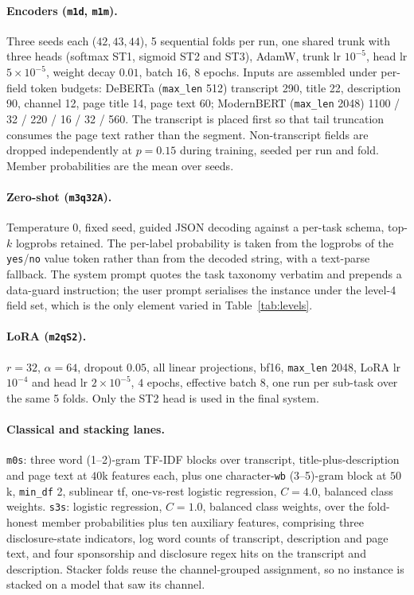 \documentclass[11pt]{article}
\newcommand{\lab}[1]{\texttt{\small #1}}
\begin{document}
\paragraph{Encoders (\lab{m1d}, \lab{m1m}).}
Three seeds each ($42,43,44$), 5 sequential folds per run, one shared trunk with three heads
(softmax ST1, sigmoid ST2 and ST3), AdamW, trunk lr $10^{-5}$, head lr $5\!\times\!10^{-5}$,
weight decay $0.01$, batch $16$, $8$ epochs. Inputs are assembled under per-field token budgets:
DeBERTa (\lab{max\_len} 512) transcript 290, title 22, description 90, channel 12, page title 14,
page text 60; ModernBERT (\lab{max\_len} 2048) 1100 / 32 / 220 / 16 / 32 / 560. The transcript is
placed first so that tail truncation consumes the page text rather than the segment.
Non-transcript fields are dropped independently at $p=0.15$ during training, seeded per run and
fold. Member probabilities are the mean over seeds.

\paragraph{Zero-shot (\lab{m3q32A}).}
Temperature $0$, fixed seed, guided JSON decoding against a per-task schema, top-$k$ logprobs
retained. The per-label probability is taken from the logprobs of the \lab{yes}/\lab{no} value
token rather than from the decoded string, with a text-parse fallback. The system prompt quotes
the task taxonomy verbatim and prepends a data-guard instruction; the user prompt serialises the
instance under the level-4 field set, which is the only element varied in
Table~\ref{tab:levels}.

\paragraph{LoRA (\lab{m2qS2}).}
$r=32$, $\alpha=64$, dropout $0.05$, all linear projections, bf16, \lab{max\_len} 2048, LoRA lr
$10^{-4}$ and head lr $2\!\times\!10^{-5}$, $4$ epochs, effective batch $8$, one run per sub-task
over the same 5 folds. Only the ST2 head is used in the final system.

\paragraph{Classical and stacking lanes.}
\lab{m0s}: three word (1--2)-gram TF-IDF blocks over transcript, title-plus-description and page
text at $40$k features each, plus one character-\lab{wb} (3--5)-gram block at $50$k,
\lab{min\_df} 2, sublinear tf, one-vs-rest logistic regression, $C=4.0$, balanced class weights.
\lab{s3s}: logistic regression, $C=1.0$, balanced class weights, over the fold-honest member
probabilities plus ten auxiliary features, comprising three disclosure-state indicators, log word
counts of transcript, description and page text, and four sponsorship and disclosure regex hits
on the transcript and description. Stacker folds reuse the channel-grouped assignment, so no
instance is stacked on a model that saw its channel.
\end{document}
